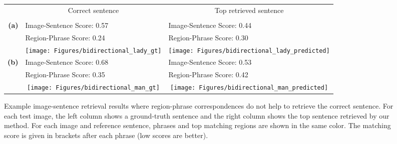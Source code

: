 \documentclass[twocolumn]{svjour3}
\begin{document}
\begin{figure*}
\centering
\begin{tabular}{rc|c}
& \large Correct sentence &  \large Top retrieved sentence\\
& \large  &  \large \\
\large\bfseries(a) & \multicolumn{1}{l|}{ Image-Sentence Score: 0.57}  & \multicolumn{1}{l}{Image-Sentence Score: 0.44} \\
 &\multicolumn{1}{l|}{Region-Phrase Score: 0.24}  & \multicolumn{1}{l}{Region-Phrase Score: 0.30} \\
&\texttt{[image: Figures/bidirectional\_lady\_gt]} & \texttt{[image: Figures/bidirectional\_lady\_predicted]} \\
\large\bfseries(b) & \multicolumn{1}{l|}{ Image-Sentence Score: 0.68}  & \multicolumn{1}{l}{Image-Sentence Score: 0.53} \\
 &\multicolumn{1}{l|}{Region-Phrase Score: 0.35}  & \multicolumn{1}{l}{Region-Phrase Score: 0.42} \\
&\texttt{[image: Figures/bidirectional\_man\_gt]} & \texttt{[image: Figures/bidirectional\_man\_predicted]} \\
\end{tabular}
	\caption{Example image-sentence retrieval results where region-phrase correspondences do not help to retrieve the correct sentence. For each test image, the left column shows a ground-truth sentence and the right column shows the top sentence retrieved by our method. For each image and reference sentence, phrases and top matching regions are shown in the same color. The matching score is given in brackets after each phrase (low scores are better). }
    \label{fig:bidirectionalOutput}
\end{figure*}
\end{document}
